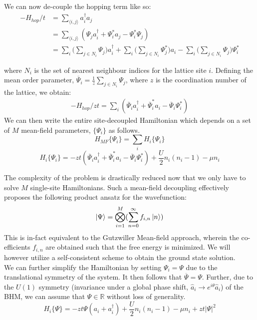 We can now de-couple the hopping term like so:
\begin{align}
    -H_{hop}/t &= \sum_{\langle i, j\rangle} a_i^{\dagger}a_j \nonumber \\
    &= \sum_{\langle i, j\rangle} (\Psi_ja_i^{\dagger} + \Psi_i^*a_j - \Psi_i^*\Psi_j)\nonumber \\
    &= \sum_i \big (\sum_{j \in N_i} \Psi_j\big ) a_i^{\dagger} + \sum_i \big (\sum_{j \in N_i} \Psi_j^*\big ) a_i - \sum_i \big (\sum_{j \in N_i} \Psi_j\big) \Psi_i^*
\end{align}

where $N_i$ is the set of nearest neighbour indices for the lattice site $i$. Defining the mean order parameter, $\overline{\Psi}_i = \frac{1}{z}\sum_{j \in N_i} \Psi_j$,  where $z$ is the coordination number of the lattice, we obtain:
\begin{align}\label{eq:mft_hop}
    -H_{hop}/zt = \sum_i (\overline{\Psi}_i a_i^{\dagger} + \overline{\Psi}_i^* a_i - \overline{\Psi}_i\Psi_i^*)
\end{align}
We can then write the entire site-decoupled Hamiltonian which depends on a set of $M$ mean-field parameters, $\{\Psi_i\}$ as follows.
\begin{equation}
    H_{MF}\{\Psi_i\} = \sum_i H_i\{\Psi_i\}
\end{equation}
\begin{equation}\label{eq:mft}
    H_i\{\Psi_i\} = -zt(\overline{\Psi}_i a_i^{\dagger} + \overline{\Psi}_i^* a_i - \overline{\Psi}_i\Psi_i^*) + \frac{U}{2}n_i(n_i - 1) - \mu n_i
\end{equation}

The complexity of the problem is drastically reduced now that we only have to solve $M$ single-site Hamiltonians. Such a mean-field decoupling effectively proposes the following product ansatz for the wavefunction:
\begin{equation}
    \ket{\Psi} = \bigotimes_{i = 1}^M (\sum_{n = 0}^{\infty} f_{i, n} \ket{n})
\end{equation}
This is in-fact equivalent to the Gutzwiller Mean-field approach\cite{Jaksch_1998}, wherein the co-efficients $f_{i, n}$ are obtained such that the free energy is minimized. We will however utilize a self-consistent scheme to obtain the ground state solution.
\vspace{0.5cm}\\
We can further simplify the Hamiltonian by setting $\Psi_i = \Psi$ due to the translational symmetry of the system. It then follows that $\overline{\Psi} = \Psi$. Further, due to the $U(1)$ symmetry (invariance under a global phase shift, $\hat{a}_i \rightarrow e^{i\theta}\hat{a}_i$) of the BHM, we can assume that $\Psi \in \mathbb{R}$ without loss of generality.
\begin{equation}\label{eq:bhm_mft}
      H_i\{\Psi\} = -zt\Psi (a_i + a_i^{\dagger}) + \frac{U}{2} n_i(n_i -1) - \mu n_i + zt|\Psi|^2
\end{equation}


